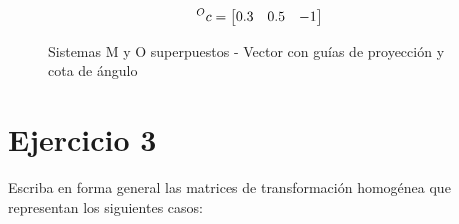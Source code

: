 \documentclass[a4paper,12pt]{article}
\begin{document}
\begin{equation*}
    \prescript{O}{}{c} = 
    \begin{bmatrix}
        0.3 & 0.5 & -1
    \end{bmatrix}
\end{equation*}

\begin{figure}[H]
    \centering
    \begin{adjustbox}{scale = 0.85, max width=\columnwidth}
    \end{adjustbox}
    \caption{Sistemas M y O superpuestos - Vector con guías de proyección y cota de ángulo}
\end{figure}

\section{Ejercicio 3}
Escriba en forma general las matrices de transformación homogénea que
representan los siguientes casos:
\end{document}

